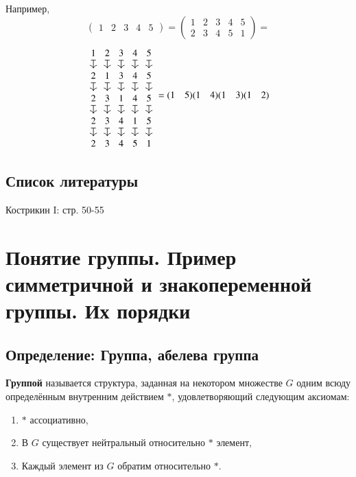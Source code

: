\documentclass{article}
\begin{document}
Например,
\[(\begin{matrix}1&2&3&4&5\end{matrix}) = \left(\begin{matrix}
1&2&3&4&5 \\
2&3&4&5&1
\end{matrix}\right) =\]
\[
\begin{tikzcd}[column sep=0.5, row sep=small]
1 \dar[mapsto]	& 2 \dar[mapsto]	& 3 \dar[mapsto]	& 4 \dar[mapsto]	& 5 \dar[mapsto]	\\
2 \dar[mapsto]	& 1 \dar[mapsto]	& 3 \dar[mapsto]	& 4 \dar[mapsto]	& 5 \dar[mapsto]	\\
2 \dar[mapsto]	& 3 \dar[mapsto]	& 1 \dar[mapsto]	& 4 \dar[mapsto]	& 5 \dar[mapsto]	\\
2 \dar[mapsto]	& 3 \dar[mapsto]	& 4 \dar[mapsto]	& 1 \dar[mapsto]	& 5 \dar[mapsto]	\\
2				& 3					& 4					& 5					& 1
\end{tikzcd}
 = (\begin{matrix}1 & 5\end{matrix})(\begin{matrix}1 & 4\end{matrix})(\begin{matrix}1 & 3\end{matrix})(\begin{matrix}1 & 2\end{matrix})\]
 
\subsection{Список литературы}
Кострикин I: стр. 50-55


\newpage
\section{Понятие группы. Пример симметричной и знакопеременной группы. Их порядки}
\subsection{Определение: Группа, абелева группа}
\textbf{Группой} называется структура, заданная на некотором множестве $G$ одним всюду определённым внутренним действием $*$, удовлетворяющий следующим аксиомам:
\begin{enumerate}
    \item $*$ ассоциативно,
    \item В $G$ существует нейтральный относительно $*$ элемент,
    \item Каждый элемент из $G$ обратим относительно $*$.
\end{enumerate}
\end{document}
